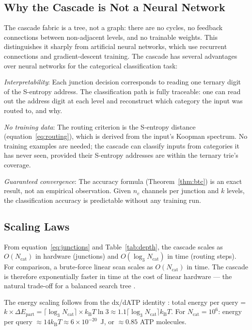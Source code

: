 \documentclass[11pt,twocolumn,a4paper]{article}
\theoremstyle{remark}
\newcommand{\kB}{k_{\mathrm{B}}}
\begin{document}
\subsection{Why the Cascade is Not a Neural Network}

The cascade fabric is a tree, not a graph: there are no cycles, no feedback
connections between non-adjacent levels, and no trainable weights. This
distinguishes it sharply from artificial neural networks, which use recurrent
connections and gradient-descent training. The cascade has several advantages
over neural networks for the categorical classification task:

\textit{Interpretability}: Each junction decision corresponds to reading one
ternary digit of the S-entropy address. The classification path is fully
traceable: one can read out the address digit at each level and reconstruct
which category the input was routed to, and why.

\textit{No training data}: The routing criterion is the S-entropy distance
(equation~\eqref{eq:routing}), which is derived from the input's Koopman spectrum.
No training examples are needed; the cascade can classify inputs from categories
it has never seen, provided their S-entropy addresses are within the ternary
trie's coverage.

\textit{Guaranteed convergence}: The accuracy formula (Theorem~\ref{thm:btc})
is an exact result, not an empirical observation. Given $n_c$ channels per
junction and $k$ levels, the classification accuracy is predictable without
any training run.

\subsection{Scaling Laws}

From equation~\eqref{eq:junctions} and Table~\ref{tab:depth}, the cascade scales
as $O(N_{\mathrm{cat}})$ in hardware (junctions) and $O(\log_3 N_{\mathrm{cat}})$
in time (routing steps). For comparison, a brute-force linear scan scales as
$O(N_{\mathrm{cat}})$ in time. The cascade is therefore exponentially faster in
time at the cost of linear hardware --- the natural trade-off for a balanced
search tree \citep{knuth1998, cormen2022}.

The energy scaling follows from the dx/dATP identity \citep{companion4}:
total energy per query = $k \times \Delta E_{\mathrm{part}} = \lceil\log_3
N_{\mathrm{cat}}\rceil \times \kB T \ln 3 \approx 1.1 \lceil\log_3
N_{\mathrm{cat}}\rceil \kB T$. For $N_{\mathrm{cat}} = 10^6$:
energy per query $\approx 14 \kB T \approx 6 \times 10^{-20}$~J, or
$\approx 0.85$ ATP molecules.
\end{document}
